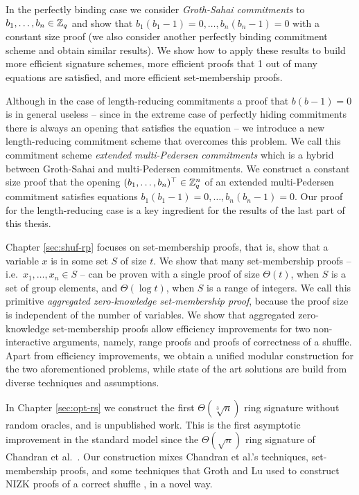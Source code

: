In the perfectly binding case we consider \emph{Groth-Sahai commitments} to $b_1,\ldots,\allowbreak b_n\allowbreak\in\mathbb{Z}_q$ and show that $b_1(b_1-1)=0,\ldots,b_n(b_n-1)=0$ with a constant size proof (we also consider another perfectly binding commitment scheme and obtain similar results). We show how to apply these results to build more efficient signature schemes, more efficient proofs that {1 out of many} equations are satisfied, and more efficient set-membership proofs.

Although in the case of length-reducing commitments a proof that $b(b-1)=0$ is in general useless -- since in the extreme case of {perfectly hiding commitments} there is always an opening that satisfies the equation -- we introduce a new length-reducing commitment scheme that overcomes this problem. We call this commitment scheme \emph{extended multi-Pedersen commitments} which is a hybrid between Groth-Sahai and multi-Pedersen commitments. We construct a constant size proof that the opening $(b_1,\ldots,b_n)^\top\in\mathbb{Z}_q^n$ of an extended multi-Pedersen commitment satisfies equations $b_1(b_1-1)=0,\ldots,b_n(b_n-1)=0$.
Our proof for the length-reducing case is a key ingredient for the results of the last part of this thesis.
 
Chapter \ref{sec:shuf-rp} focuses on set-membership proofs, that is, show that a variable $x$ is in some set $S$ of size $t$. We show that many set-membership proofs -- i.e.~$x_1,\ldots,x_n\in S$ -- can be proven with a single proof of size $\Theta(t)$, when $S$ is a set of group elements, and $\Theta(\log t)$, when $S$ is a range of integers. We call this primitive \emph{aggregated zero-knowledge set-membership proof}, because the proof size is independent of the number of variables. We show that aggregated zero-knowledge set-membership proofs allow efficiency improvements for two non-interactive arguments, namely, range proofs and proofs of correctness of a shuffle. Apart from efficiency improvements, we obtain a unified modular construction for the two aforementioned problems, while state of the art solutions are build from diverse techniques and assumptions.

In Chapter \ref{sec:opt-rs} we construct the first $\Theta(\sqrt[3]{n})$ ring signature without random oracles, and is unpublished work.
This is the first asymptotic improvement in the standard model since the $\Theta(\sqrt{n})$ ring signature of Chandran et al.~\cite{ICALP:ChaGroSah07}.
Our construction mixes Chandran et al.'s techniques, set-membership proofs, and some techniques that Groth and Lu used to construct NIZK proofs of a correct shuffle \cite{AC:GroLu07}, in a novel way.


